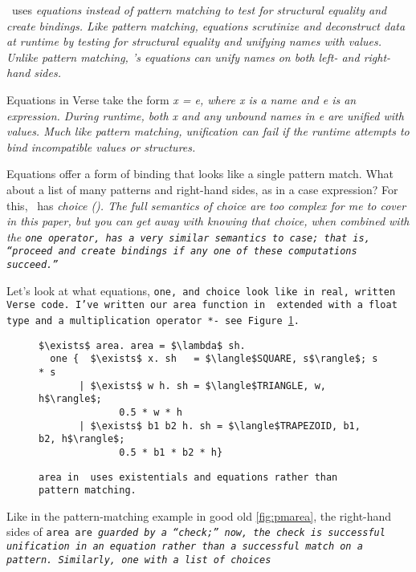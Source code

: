 \documentclass[manuscript,screen,review, 12pt, nonacm]{acmart}
\begin{document}
\begin{outline}[enumerate]
    \VC\ uses \it{equations} instead of pattern matching to test for structural
    equality and create bindings. Like pattern matching, equations scrutinize
    and deconstruct data at runtime by testing for structural equality and
    unifying names with values. Unlike pattern matching, \VC's equations can
    unify names on both left- \it{and} right-hand sides. 

    Equations in Verse take the form \it{x = e}, where \it{x} is a name and
    \it{e} is an expression. During runtime, both \it{x} and any unbound names
    in \it{e} are unified with values. Much like pattern matching, unification
    can fail if the runtime attempts to bind incompatible values or structures. 

    Equations offer a form of binding that looks like a single pattern match.
    What about a list of many patterns and right-hand sides, as in a case
    expression? For this, \VC\ has \it{choice} (\choice). The full semantics of
    choice are too complex for me to cover in this paper, but you can get away
    with knowing that choice, when combined with the \tt{one} operator, has a
    very similar semantics to case; that is, “proceed and create bindings if any
    one of these computations succeed.” 

    Let's look at what equations, \tt{one}, and choice look like in real,
    written Verse code. I've written our \tt{area} function in \VC\ extended
    with a \tt{float} type and a multiplication operator \tt{*}- see
    Figure~\ref{fig:versearea}. 

    \begin{figure}[]
        \verselst
        \begin{lstlisting}[numbers=none]
$\exists$ area. area = $\lambda$ sh. 
  one {  $\exists$ x. sh   = $\langle$SQUARE, s$\rangle$; s * s
       | $\exists$ w h. sh = $\langle$TRIANGLE, w, h$\rangle$; 
              0.5 * w * h
       | $\exists$ b1 b2 h. sh = $\langle$TRAPEZOID, b1, b2, h$\rangle$; 
              0.5 * b1 * b2 * h}
        \end{lstlisting}
    \caption{\tt{area} in \VC\ uses existentials and equations rather than
    pattern matching.} 
    \label{fig:versearea}
    \end{figure}

    Like in the pattern-matching example in good old \ref{fig:pmarea}, the
    right-hand sides of \tt{area} are \it{guarded} by a “check;” now, the check
    is successful unification in an equation rather than a successful match on a
    pattern. Similarly, \tt{one} with a list of choices 


\end{outline}
\end{document}
